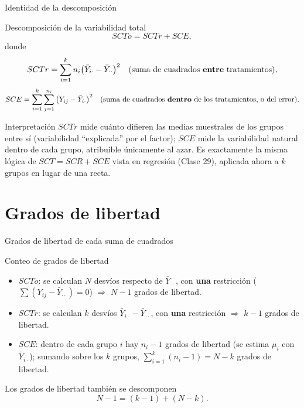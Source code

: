 \documentclass[aspectratio=169,11pt]{beamer}
\begin{document}
\begin{frame}{Identidad de la descomposición}
\begin{alertblock}{Descomposición de la variabilidad total}
\[
SCTo = SCTr + SCE,
\]
donde
\[
SCTr = \sum_{i=1}^k n_i\big(\bar Y_{i\cdot}-\bar Y_{\cdot\cdot}\big)^2 \quad \text{(suma de cuadrados \textbf{entre} tratamientos)},
\]
\[
SCE = \sum_{i=1}^k \sum_{j=1}^{n_i} \big(Y_{ij}-\bar Y_{i\cdot}\big)^2 \quad \text{(suma de cuadrados \textbf{dentro} de los tratamientos, o del error)}.
\]
\end{alertblock}

\begin{block}{Interpretación}
$SCTr$ mide cuánto difieren las medias muestrales de los grupos entre sí (variabilidad ``explicada'' por el factor); $SCE$ mide la variabilidad natural dentro de cada grupo, atribuible únicamente al azar. Es exactamente la misma lógica de $SCT=SCR+SCE$ vista en regresión (Clase 29), aplicada ahora a $k$ grupos en lugar de una recta.
\end{block}
\end{frame}

\section{Grados de libertad}

\begin{frame}{Grados de libertad de cada suma de cuadrados}
\begin{block}{Conteo de grados de libertad}
\begin{itemize}
\item $SCTo$: se calculan $N$ desvíos respecto de $\bar Y_{\cdot\cdot}$, con \textbf{una} restricción ($\sum(Y_{ij}-\bar Y_{\cdot\cdot})=0$) $\Rightarrow$ $N-1$ grados de libertad.
\item $SCTr$: se calculan $k$ desvíos $\bar Y_{i\cdot}-\bar Y_{\cdot\cdot}$, con \textbf{una} restricción $\Rightarrow$ $k-1$ grados de libertad.
\item $SCE$: dentro de cada grupo $i$ hay $n_i-1$ grados de libertad (se estima $\mu_i$ con $\bar Y_{i\cdot}$); sumando sobre los $k$ grupos, $\displaystyle\sum_{i=1}^k (n_i-1) = N-k$ grados de libertad.
\end{itemize}
\end{block}

\begin{block}{Los grados de libertad también se descomponen}
\[
N-1 = (k-1) + (N-k).
\]
\end{block}
\end{frame}
\end{document}
